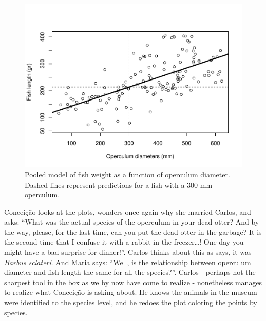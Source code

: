 \documentclass[
]{book}
\newenvironment{Shaded}{\begin{snugshade}}{\end{snugshade}}
\newcommand{\AttributeTok}[1]{\textcolor[rgb]{0.77,0.63,0.00}{#1}}
\newcommand{\CommentTok}[1]{\textcolor[rgb]{0.56,0.35,0.01}{\textit{#1}}}
\newcommand{\DecValTok}[1]{\textcolor[rgb]{0.00,0.00,0.81}{#1}}
\newcommand{\FunctionTok}[1]{\textcolor[rgb]{0.00,0.00,0.00}{#1}}
\newcommand{\NormalTok}[1]{#1}
\newcommand{\SpecialCharTok}[1]{\textcolor[rgb]{0.00,0.00,0.00}{#1}}
\newcommand{\StringTok}[1]{\textcolor[rgb]{0.31,0.60,0.02}{#1}}
\begin{document}
\begin{Shaded}
\end{Shaded}

\begin{figure}

{\centering \includegraphics[width=0.8\linewidth]{ECOMODbook_files/figure-latex/wod-1} 

}

\caption{Pooled model of fish weight as a function of operculum diameter. Dashed lines represent predictions for a fish with a 300 mm operculum.}\label{fig:wod}
\end{figure}

Conceição looks at the plots, wonders once again why she married Carlos, and asks: ``What was the actual species of the operculum in your dead otter? And by the way, please, for the last time, can you put the dead otter in the garbage? It is the second time that I confuse it with a rabbit in the freezer\ldots! One day you might have a bad surprise for dinner!''. Carlos thinks about this as says, it was \emph{Barbus sclateri}. And Maria says: ``Well, is the relationship between operculum diameter and fish length the same for all the species?''. Carlos - perhaps not the sharpest tool in the box as we by now have come to realize - nonetheless manages to realize what Conceição is asking about. He knows the animals in the museum were identified to the species level, and he redoes the plot coloring the points by species.
\end{document}
